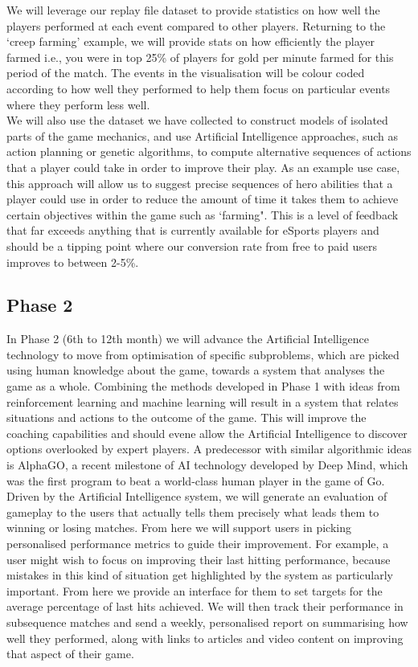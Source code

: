 \documentclass[12pt]{article} %
\begin{document}
We will leverage our replay file dataset to provide statistics on how well the players performed at each event compared to other players. Returning to the `creep farming' example, we will provide stats on how efficiently the player farmed i.e., you were in top 25\% of players for gold per minute farmed for this period of the match. The events in the visualisation will be colour coded according to how well they performed to help them focus on particular events where they perform less well.\\

We will also use the dataset we have collected to construct models of isolated parts of the game mechanics, and use Artificial Intelligence approaches, such as action planning or genetic algorithms, to compute alternative sequences of actions that a player could take in order to improve their play. As an example use case, this approach will allow us to suggest precise sequences of hero abilities that a player could use in order to reduce the amount of time it takes them to achieve certain objectives within the game such as `farming". This is a level of feedback that far exceeds anything that is currently available for eSports players and should be a tipping point where our conversion rate from free to paid users improves to between 2-5\%.

\subsection{Phase 2}

In Phase 2 (6th to 12th month) we will advance the Artificial Intelligence technology to move from optimisation of specific subproblems, which are picked using human knowledge about the game, towards a system that analyses the game as a whole. Combining the methods developed in Phase 1 with ideas from reinforcement learning and machine learning will result in a system that relates situations and actions to the outcome of the game. This will improve the coaching capabilities and should evene allow the Artificial Intelligence to discover options overlooked by expert players. A predecessor with similar algorithmic ideas is AlphaGO, a recent milestone of AI technology developed by Deep Mind, which was the first program to beat a world-class human player in the game of Go.\\

Driven by the Artificial Intelligence system, we will generate an evaluation of gameplay to the users that actually tells them precisely what leads them to winning or losing matches. From here we will support users in picking personalised performance metrics to guide their improvement. For example, a user might wish to focus on improving their last hitting performance, because mistakes in this kind of situation get highlighted by the system as particularly important. From here we provide an interface for them to set targets for the average percentage of last hits achieved. We will then track their performance in subsequence matches and send a weekly, personalised report on summarising how well they performed, along with links to articles and video content on improving that aspect of their game.
\end{document}

